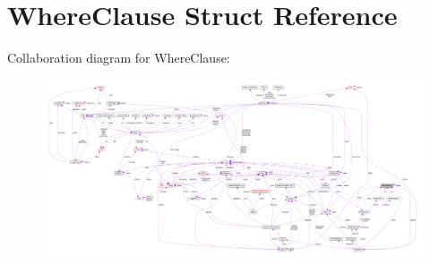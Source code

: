 \hypertarget{structWhereClause}{}\section{Where\+Clause Struct Reference}
\label{structWhereClause}


Collaboration diagram for Where\+Clause\+:\nopagebreak
\begin{figure}[H]
\begin{center}
\leavevmode
\includegraphics[width=350pt]{structWhereClause__coll__graph}
\end{center}
\end{figure}
